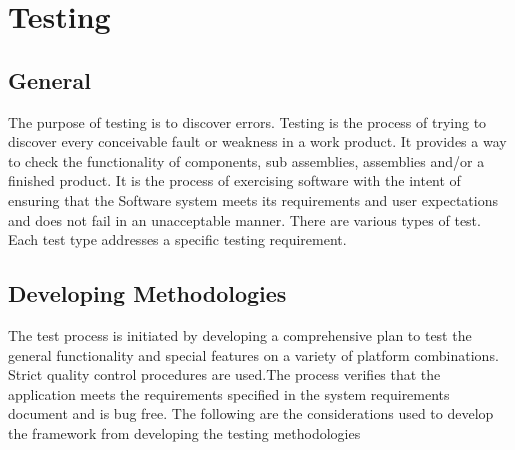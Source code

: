 	\makeatletter
	\def\@makechapterhead#1{%
	  \vspace*{50\p@}%
	  {\parindent \z@ \centering\normalfont
	    \ifnum \c@secnumdepth >\m@ne
	      \if@mainmatter
	         \Large\bfseries \@chapapp\space \thechapter
 	        \par\nobreak
	        \vskip 20\p@
	      \fi
	    \fi
	    \interlinepenalty\@M
	     \Large \bfseries #1\par\nobreak
	
	    \vskip 40\p@
	  }}
	\def\@makeschapterhead#1{%
	  \vspace*{50\p@}%
	  {\parindent \z@ \centering 
	    \normalfont
	    \interlinepenalty\@M
	    \Large\bfseries  #1\par\nobreak
	    \vskip 40\p@
	  }}
	\makeatother
	\titlespacing*{\chapter}{0pt}{0pt}{12pt}
\chapter{Testing}

\section{General}
The purpose of testing is to discover errors. Testing is the process of trying to discover every conceivable fault or weakness in a work product. It provides a way to check the functionality of components, sub assemblies, assemblies and/or a finished product. It is the process of exercising software with the intent of ensuring that the Software system meets its requirements and user expectations and does not fail in an unacceptable manner. There are various types of test. Each test type addresses a specific testing requirement.

\section{Developing Methodologies}
The test process is initiated by developing a comprehensive plan to test the general functionality and special features on a variety of platform combinations. Strict quality control procedures are used.The process verifies that the application meets the requirements specified in the system requirements document and is bug free. The following are the considerations used to develop the framework from developing the testing methodologies


